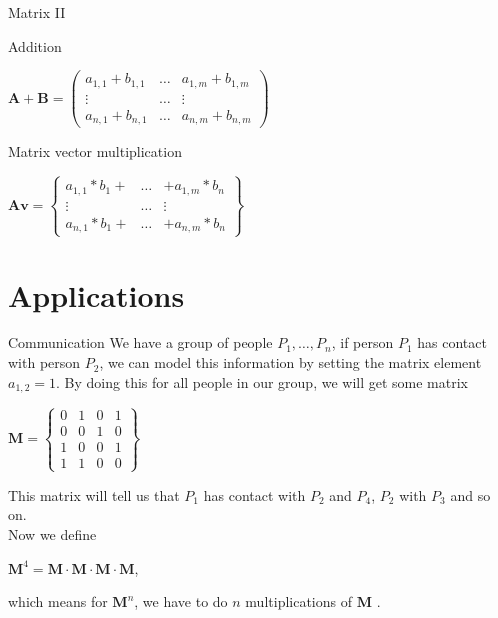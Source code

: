 \documentclass[\classoption]{beamer}
\begin{document}
\begin{frame}{Matrix II}

\begin{block}{Addition}
\begin{center}
$ \mathbf{A} + \mathbf{B}  = \begin{pmatrix}
a_{1,1} + b_{1,1}  & \ldots & a_{1,m} + b_{1,m} \\
\vdots & \ldots & \vdots \\
a_{n,1} + b_{n,1} & \ldots & a_{n,m} + b_{n,m} 
\end{pmatrix} $
\end{center}
\end{block}

\begin{block}{Matrix vector multiplication}
\begin{center}
$ \mathbf{A}  \mathbf{v}  = \left\lbrace\begin{matrix}
a_{1,1} * b_{1} + & \ldots & + a_{1,m} * b_{n} \\
\vdots & \ldots & \vdots \\
a_{n,1} * b_{1} + & \ldots & + a_{n,m} * b_{n} 
\end{matrix} \right\rbrace $
\end{center}
\end{block}

\end{frame}


\section{Applications}


\begin{frame}{Communication}
We have a group of people $P_1,\ldots,P_n$, if person $P_1$ has contact with person $P_2$, we can model this information by setting the matrix element $a_{1,2}=1$. By doing this for all people in our group, we will get some matrix \\

\begin{center}
$
\mathbf{M} = \left\lbrace\begin{matrix}
0 & 1 & 0 & 1 \\
0 & 0 & 1 & 0 \\
1 & 0 & 0 & 1 \\
1 & 1 & 0 & 0
\end{matrix} \right\rbrace
$
\end{center}
This matrix will tell us that $P_1$ has contact with $P_2$ and $P_4$, $P_2$ with $P_3$ and so on. \\
Now we define
\begin{center}
$\mathbf{M}^4 = \mathbf{M} \cdot \mathbf{M} \cdot \mathbf{M} \cdot \mathbf{M} $,  
\end{center}
which means for $\mathbf{M}^n$, we have to do $n$ multiplications of $\mathbf{M}$ .
\end{frame}
\end{document}
